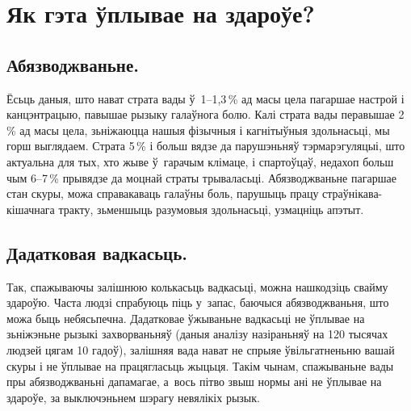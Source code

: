 \section{Як гэта ўплывае на здароўе?}

\subsection{Абязводжваньне.}
Ёсьць даныя, што нават страта вады ў~1--1,3\,\% ад масы цела пагаршае настрой і канцэнтрацыю, павышае рызыку галаўнога болю. Калі страта вады перавышае 2\,\% ад масы цела, зьніжаюцца нашыя фізычныя і кагнітыўныя здольнасьці, мы горш выглядаем. Страта 5\,\% і больш вядзе да парушэньняў тэрмарэгуляцыі, што актуальна для тых, хто жыве ў~гарачым клімаце, і спартоўцаў, недахоп больш чым 6--7\,\% прывядзе да моцнай страты трываласьці. Абязводжваньне пагаршае стан скуры, можа справакаваць галаўны боль, парушыць працу страўнікава-кішачнага тракту, зьменшыць разумовыя здольнасьці, узмацніць апэтыт.


\subsection{Дадатковая вадкасьць.}
Так, спажываючы залішнюю колькасьць вадкасьці, можна нашкодзіць свайму здароўю. Часта людзі спрабуюць піць у~запас, баючыся абязводжваньня, што можа быць небясьпечна. Дадатковае ўжываньне вадкасьці не ўплывае на зьніжэньне рызыкі захворваньняў (даныя аналізу назіраньняў на 120 тысячах людзей цягам 10 гадоў), залішняя вада нават не спрыяе ўвільгатненьню вашай скуры і не ўплывае на працягласьць жыцьця. Такім чынам, спажываньне вады пры абязводжваньні дапамагае, а~вось пітво звыш нормы ані не ўплывае на здароўе, за выключэньнем шэрагу невялікіх рызык.

